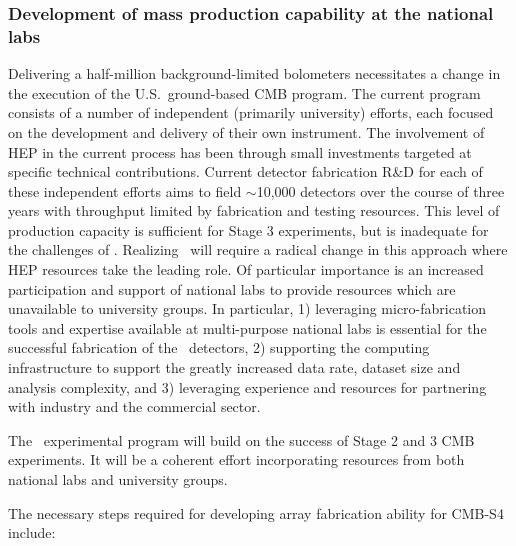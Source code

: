 \subsubsection{Development of mass production capability at the national labs}

Delivering a half-million background-limited bolometers necessitates a
change in the execution of the U.S.\ ground-based CMB program. The
current program consists of a number of independent (primarily
university) efforts, each focused on the development and delivery of
their own instrument. The involvement of HEP in the current process
has been through small investments targeted at specific technical
contributions. 
Current detector fabrication R\&D for each of these independent efforts aims to field $\sim$10,000 detectors over the course of three years with throughput limited by fabrication and testing resources. This level of production capacity is sufficient for Stage 3 experiments, but is inadequate for the challenges of \cmbexp. 
Realizing \cmbexp\ will require a radical change in
this approach where HEP resources take the leading role. Of particular
importance is an increased participation and support of national labs
to provide resources which are unavailable to university groups. In
particular, 1) leveraging micro-fabrication tools and expertise
available at multi-purpose national labs is essential for the
successful fabrication of the \cmbexp\ detectors, 2) supporting
the computing infrastructure to support the greatly increased data
rate, dataset size and analysis complexity, 
and 3) leveraging experience and resources for partnering with industry and the commercial sector.

The \cmbexp\ experimental program will build on the success of Stage
2 and 3 CMB experiments.  It will be a coherent effort
incorporating resources from both national labs and university groups.

The necessary steps required for developing array fabrication ability
for CMB-S4 include:

